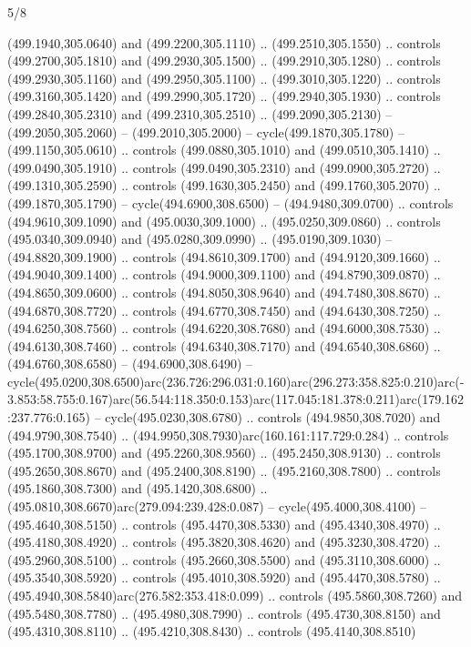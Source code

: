 \begin{flagdescription}{5/8}
\begin{scope}[xshift=0.5\flaglength,yshift=0.5\flagwidth,scale=\flagwidth/475.63]
\begin{scope}[y=0.8pt, x=0.8pt, yscale=-1, xscale=1,shift={(-450,-300)}]
\begin{scope}[cm={{1.0,0.0,0.0,1.0,(-0.0002,0.12556)}},cm={{1.0,0.0,0.0,1.0,(0.00179,0.0)}}]
\begin{scope}[cm={{1.11592,0.0,0.0,1.11592,(-106.89933,-41.77764)}}]
\begin{scope}[draw=black,fill=cfff]
\begin{scope}[fill=black]
  (499.1940,305.0640) and (499.2200,305.1110) .. (499.2510,305.1550) .. controls
  (499.2700,305.1810) and (499.2930,305.1500) .. (499.2910,305.1280) .. controls
  (499.2930,305.1160) and (499.2950,305.1100) .. (499.3010,305.1220) .. controls
  (499.3160,305.1420) and (499.2990,305.1720) .. (499.2940,305.1930) .. controls
  (499.2840,305.2310) and (499.2310,305.2510) .. (499.2090,305.2130) --
  (499.2050,305.2060) -- (499.2010,305.2000) -- cycle(499.1870,305.1780) --
  (499.1150,305.0610) .. controls (499.0880,305.1010) and (499.0510,305.1410) ..
  (499.0490,305.1910) .. controls (499.0490,305.2310) and (499.0900,305.2720) ..
  (499.1310,305.2590) .. controls (499.1630,305.2450) and (499.1760,305.2070) ..
  (499.1870,305.1790) -- cycle(494.6900,308.6500) -- (494.9480,309.0700) ..
  controls (494.9610,309.1090) and (495.0030,309.1000) .. (495.0250,309.0860) ..
  controls (495.0340,309.0940) and (495.0280,309.0990) .. (495.0190,309.1030) --
  (494.8820,309.1900) .. controls (494.8610,309.1700) and (494.9120,309.1660) ..
  (494.9040,309.1400) .. controls (494.9000,309.1100) and (494.8790,309.0870) ..
  (494.8650,309.0600) .. controls (494.8050,308.9640) and (494.7480,308.8670) ..
  (494.6870,308.7720) .. controls (494.6770,308.7450) and (494.6430,308.7250) ..
  (494.6250,308.7560) .. controls (494.6220,308.7680) and (494.6000,308.7530) ..
  (494.6130,308.7460) .. controls (494.6340,308.7170) and (494.6540,308.6860) ..
  (494.6760,308.6580) -- (494.6900,308.6490) --
  cycle(495.0200,308.6500)arc(236.726:296.031:0.160)arc(296.273:358.825:0.210)arc(-3.853:58.755:0.167)arc(56.544:118.350:0.153)arc(117.045:181.378:0.211)arc(179.162:237.776:0.165)
  -- cycle(495.0230,308.6780) .. controls (494.9850,308.7020) and
  (494.9790,308.7540) .. (494.9950,308.7930)arc(160.161:117.729:0.284) ..
  controls (495.1700,308.9700) and (495.2260,308.9560) .. (495.2450,308.9130) ..
  controls (495.2650,308.8670) and (495.2400,308.8190) .. (495.2160,308.7800) ..
  controls (495.1860,308.7300) and (495.1420,308.6800) ..
  (495.0810,308.6670)arc(279.094:239.428:0.087) -- cycle(495.4000,308.4100) --
  (495.4640,308.5150) .. controls (495.4470,308.5330) and (495.4340,308.4970) ..
  (495.4180,308.4920) .. controls (495.3820,308.4620) and (495.3230,308.4720) ..
  (495.2960,308.5100) .. controls (495.2660,308.5500) and (495.3110,308.6000) ..
  (495.3540,308.5920) .. controls (495.4010,308.5920) and (495.4470,308.5780) ..
  (495.4940,308.5840)arc(276.582:353.418:0.099) .. controls (495.5860,308.7260)
  and (495.5480,308.7780) .. (495.4980,308.7990) .. controls (495.4730,308.8150)
  and (495.4310,308.8110) .. (495.4210,308.8430) .. controls (495.4140,308.8510)

\end{scope}
\end{scope}
\end{scope}
\end{scope}
\end{scope}
\end{scope}
\end{flagdescription}
